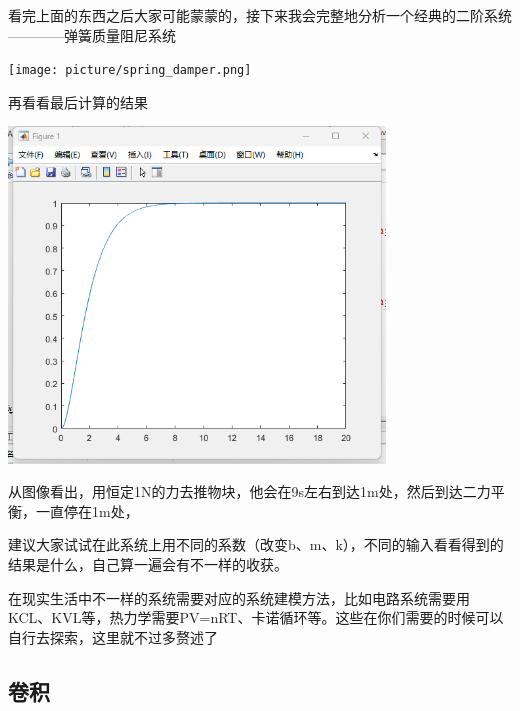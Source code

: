 \documentclass[UTF8,a4paper,12pt]{ctexart}
\begin{document}
  \begin{flushleft}
    看完上面的东西之后大家可能蒙蒙的，接下来我会完整地分析一个经典的二阶系统————弹簧质量阻尼系统 
  \end{flushleft}
  
   
    \begin{notitlebox}
     
          \texttt{[image: picture/spring\_damper.png]}
      \par 再看看最后计算的结果
      \par \includegraphics[width=10cm]{picture/result.png}
   \par 从图像看出，用恒定1N的力去推物块，他会在9s左右到达1m处，然后到达二力平衡，一直停在1m处，
   \par 建议大家试试在此系统上用不同的系数（改变b、m、k），不同的输入看看得到的结果是什么，自己算一遍会有不一样的收获。
    \end{notitlebox}
    \begin{flushleft}
      在现实生活中不一样的系统需要对应的系统建模方法，比如电路系统需要用KCL、KVL等，热力学需要PV=nRT、卡诺循环等。这些在你们需要的时候可以自行去探索，这里就不过多赘述了
    \end{flushleft}
  \subsection{卷积}
\end{document}
